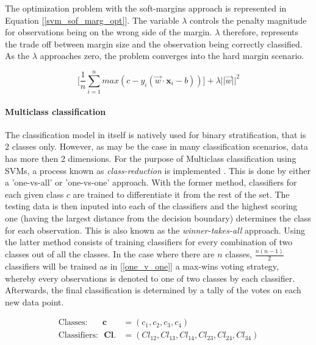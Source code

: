 	The optimization problem with the soft-margins approach is represented in Equation [\ref{svm_sof_marg_opt}]. The variable $\lambda$ controls the penalty magnitude for observations being on the wrong side of the margin. $\lambda$ therefore, represents the trade off between margin size and the observation being correctly classified. As the $\lambda$ approaches zero, the problem converges into the hard margin scenario.

	\begin{equation}
		\Bigg[
		\frac{1}{n} \sum_{i=1}^{n}max(c-y_i(\vec{w} \cdot \textbf{x}_i - b )) 
		\Bigg]
		+ \lambda || \vec{w} ||^2
		\label{svm_sof_marg_opt}
	\end{equation}

\paragraph{Multiclass classification}
	The classification model in itself is natively used for binary stratification, that is 2 classes only. However, as may be the case in many classification scenarios, data has more then 2 dimensions. For the purpose of Multiclass classification using SVMs, a process known as \textit{class-reduction} is implemented \cite{aly2005survey}. This is done by either a 'one-vs-all' or 'one-vs-one' approach. With the former method, classifiers for each given class $c$ are trained to differentiate it from the rest of the set. The testing data is then inputed into each of the classifiers and the highest scoring one (having the largest distance from the decision boundary) determines the class for each observation. This is also known as the \textit{winner-takes-all} approach. Using the latter method consists of training classifiers for every combination of two classes out of all the classes. In the case where there are $n$ classes, $\frac{n(n-1)}{2} $ classifiers will be trained as in [\ref{one_v_one}]
	a max-wins voting strategy, whereby every observations is denoted to one of two classes by each classifier. Afterwards, the final classification is determined by a tally of the votes on each new data point.
	
	\begin{equation}
		\begin{aligned}
			\text{Classes:}	\ \ \ \ \ \ \ \	\textbf{c} &= (c_1,c_2,c_3,c_4) \\
			\text{Classifiers:}\ \ \ 	\textbf{Cl.} &= (Cl_{12},Cl_{13},Cl_{14},Cl_{23},Cl_{24},Cl_{34})
		\end{aligned}	
		\label{one_v_one}
	\end{equation}

